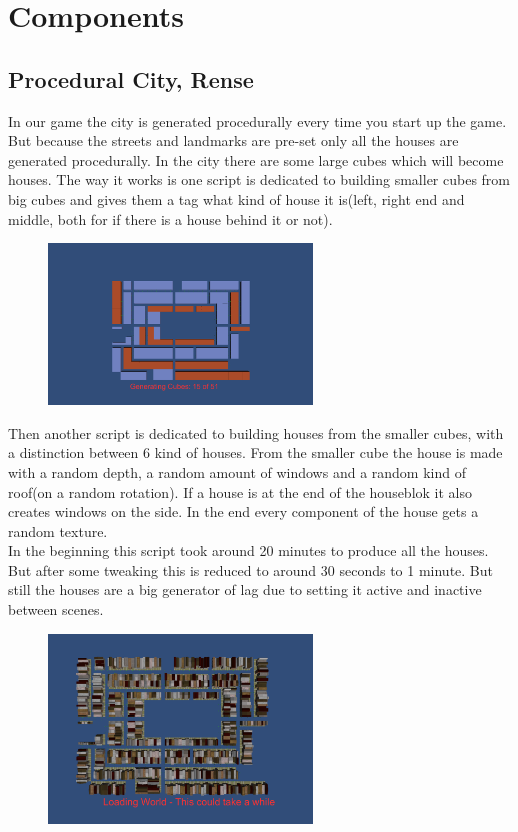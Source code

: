 \documentclass{article}
\begin{document}
\section{Components}

\subsection{Procedural City, Rense}
In our game the city is generated procedurally every time you start up the game. But because the streets and landmarks are pre-set only all the houses are generated procedurally. In the city there are some large cubes which will become houses. The way it works is one script is dedicated to building smaller cubes from big cubes and gives them a tag what kind of house it is(left, right end and middle, both for if there is a house behind it or not). \\

	\begin{figure}[ht!]
		\centering
		\includegraphics[width=70mm]{images/Procedural.png}
	\end{figure}
Then another script is dedicated to building houses from the smaller cubes, with a distinction between 6 kind of houses. From the smaller cube the house is made with a random depth, a random amount of windows and a random kind of roof(on a random rotation). If a house is at the end of the houseblok it also creates windows on the side. In the end every component of the house gets a random texture.\\



In the beginning this script took around 20 minutes to produce all the houses. But after some tweaking this is reduced to around 30 seconds to 1 minute. But still the houses are a big generator of lag due to setting it active and inactive between scenes.

	\begin{figure}[ht!]
		\centering
		\includegraphics[width=70mm]{images/Generated.png}
	\end{figure}
\end{document}
